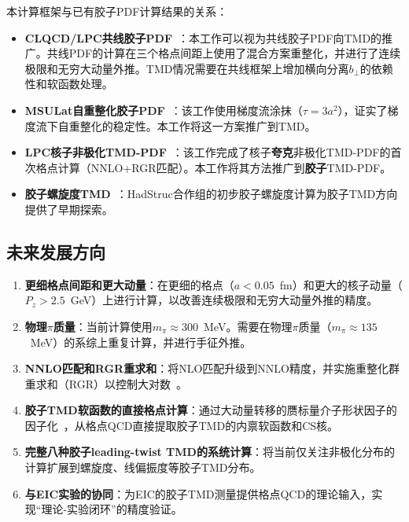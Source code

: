 \documentclass[12pt,a4paper]{ctexart}
\theoremstyle{definition}
\newcommand{\bperp}{b_\perp}
\begin{document}
本计算框架与已有胶子PDF计算结果的关系：

\begin{itemize}
    \item \textbf{CLQCD/LPC共线胶子PDF}~\cite{Chen2025gluon}：本工作可以视为共线胶子PDF向TMD的推广。共线PDF的计算在三个格点间距上使用了混合方案重整化，并进行了连续极限和无穷大动量外推。TMD情况需要在共线框架上增加横向分离$\bperp$的依赖性和软函数处理。
    \item \textbf{MSULat自重整化胶子PDF}~\cite{NieMiera2025}：该工作使用梯度流涂抹（$\tau=3a^2$），证实了梯度流下自重整化的稳定性。本工作将这一方案推广到TMD。
    \item \textbf{LPC核子非极化TMD-PDF}~\cite{He2024unpolTMD}：该工作完成了核子\textbf{夸克}非极化TMD-PDF的首次格点计算（NNLO+RGR匹配）。本工作将其方法推广到\textbf{胶子}TMD-PDF。
    \item \textbf{胶子螺旋度TMD}~\cite{Egerer:2022rfj}：HadStruc合作组的初步胶子螺旋度计算为胶子TMD方向提供了早期探索。
\end{itemize}

\subsection{未来发展方向}

\begin{enumerate}[leftmargin=*]
    \item \textbf{更细格点间距和更大动量}：在更细的格点（$a < 0.05$~fm）和更大的核子动量（$P_z > 2.5$~GeV）上进行计算，以改善连续极限和无穷大动量外推的精度。
    \item \textbf{物理$\pi$质量}：当前计算使用$m_\pi \approx 300$~MeV。需要在物理$\pi$质量（$m_\pi \approx 135$~MeV）的系综上重复计算，并进行手征外推。
    \item \textbf{NNLO匹配和RGR重求和}：将NLO匹配升级到NNLO精度，并实施重整化群重求和（RGR）以控制大对数~\cite{He2024unpolTMD}。
    \item \textbf{胶子TMD软函数的直接格点计算}：通过大动量转移的赝标量介子形状因子的因子化~\cite{LPC2020soft,Chu2023soft}，从格点QCD直接提取胶子TMD的内禀软函数和CS核。
    \item \textbf{完整八种胶子leading-twist TMD的系统计算}：将当前仅关注非极化分布的计算扩展到螺旋度、线偏振度等胶子TMD分布。
    \item \textbf{与EIC实验的协同}：为EIC的胶子TMD测量提供格点QCD的理论输入，实现``理论-实验闭环''的精度验证。
\end{enumerate}

\end{document}
